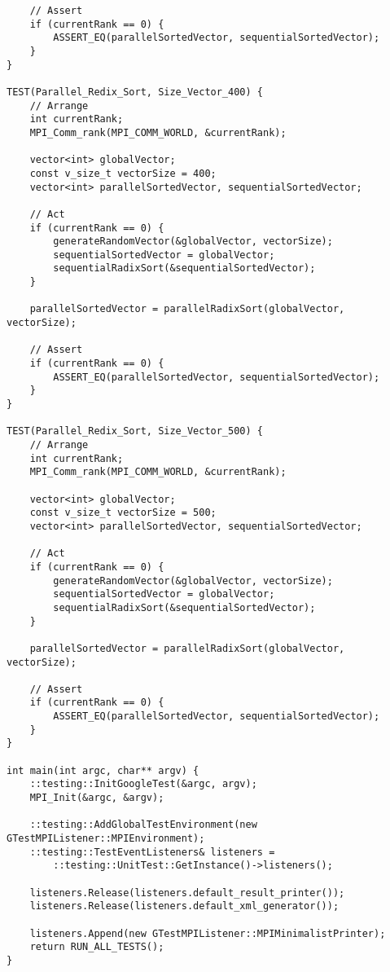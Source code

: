 \documentclass{report}
\begin{document}
\begin{lstlisting}
    // Assert
    if (currentRank == 0) {
        ASSERT_EQ(parallelSortedVector, sequentialSortedVector);
    }
}

TEST(Parallel_Redix_Sort, Size_Vector_400) {
    // Arrange
    int currentRank;
    MPI_Comm_rank(MPI_COMM_WORLD, &currentRank);

    vector<int> globalVector;
    const v_size_t vectorSize = 400;
    vector<int> parallelSortedVector, sequentialSortedVector;

    // Act
    if (currentRank == 0) {
        generateRandomVector(&globalVector, vectorSize);
        sequentialSortedVector = globalVector;
        sequentialRadixSort(&sequentialSortedVector);
    }

    parallelSortedVector = parallelRadixSort(globalVector, vectorSize);

    // Assert
    if (currentRank == 0) {
        ASSERT_EQ(parallelSortedVector, sequentialSortedVector);
    }
}

TEST(Parallel_Redix_Sort, Size_Vector_500) {
    // Arrange
    int currentRank;
    MPI_Comm_rank(MPI_COMM_WORLD, &currentRank);

    vector<int> globalVector;
    const v_size_t vectorSize = 500;
    vector<int> parallelSortedVector, sequentialSortedVector;

    // Act
    if (currentRank == 0) {
        generateRandomVector(&globalVector, vectorSize);
        sequentialSortedVector = globalVector;
        sequentialRadixSort(&sequentialSortedVector);
    }

    parallelSortedVector = parallelRadixSort(globalVector, vectorSize);

    // Assert
    if (currentRank == 0) {
        ASSERT_EQ(parallelSortedVector, sequentialSortedVector);
    }
}

int main(int argc, char** argv) {
    ::testing::InitGoogleTest(&argc, argv);
    MPI_Init(&argc, &argv);

    ::testing::AddGlobalTestEnvironment(new GTestMPIListener::MPIEnvironment);
    ::testing::TestEventListeners& listeners =
        ::testing::UnitTest::GetInstance()->listeners();

    listeners.Release(listeners.default_result_printer());
    listeners.Release(listeners.default_xml_generator());

    listeners.Append(new GTestMPIListener::MPIMinimalistPrinter);
    return RUN_ALL_TESTS();
}

\end{lstlisting}
\end{document}
